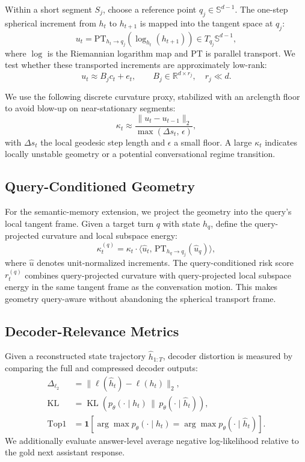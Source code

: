 \documentclass[conference]{IEEEtran}
\newcommand{\R}{\mathbb{R}}
\newcommand{\Sph}{\mathbb{S}}
\newcommand{\KL}{\operatorname{KL}}
\newcommand{\Logit}{\Delta_{\ell_2}}
\begin{document}
Within a short segment $S_j$, choose a reference point $q_j \in \Sph^{d-1}$. The one-step spherical increment from $h_t$ to $h_{t+1}$ is mapped into the tangent space at $q_j$:
\begin{equation}
u_t = \mathrm{PT}_{h_t \rightarrow q_j}\!\left(\log_{h_t}(h_{t+1})\right)
\in T_{q_j}\Sph^{d-1},
\end{equation}
where $\log$ is the Riemannian logarithm map and $\mathrm{PT}$ is parallel transport. We test whether these transported increments are approximately low-rank:
\begin{equation}
u_t \approx B_j c_t + e_t, \qquad B_j \in \R^{d \times r_j}, \quad r_j \ll d.
\end{equation}

We use the following discrete curvature proxy, stabilized with an arclength floor to avoid blow-up on near-stationary segments:
\begin{equation}
\kappa_t \approx \frac{\lVert u_t - u_{t-1} \rVert_2}{\max(\Delta s_t,\, \epsilon)},
\end{equation}
with $\Delta s_t$ the local geodesic step length and $\epsilon$ a small floor. A large $\kappa_t$ indicates locally unstable geometry or a potential conversational regime transition.

\subsection{Query-Conditioned Geometry}
For the semantic-memory extension, we project the geometry into the query's local tangent frame. Given a target turn $q$ with state $h_q$, define the query-projected curvature and local subspace energy:
\begin{equation}
\kappa_t^{(q)} = \kappa_t \cdot \langle \hat{u}_t,\, \mathrm{PT}_{h_q \rightarrow q_j}(\hat{u}_q) \rangle,
\end{equation}
where $\hat{u}$ denotes unit-normalized increments. The query-conditioned risk score $r_t^{(q)}$ combines query-projected curvature with query-projected local subspace energy in the same tangent frame as the conversation motion. This makes geometry query-aware without abandoning the spherical transport frame.

\subsection{Decoder-Relevance Metrics}
Given a reconstructed state trajectory $\widehat{h}_{1:T}$, decoder distortion is measured by comparing the full and compressed decoder outputs:
\begin{align}
\Logit &= \lVert \ell(\widehat{h}_t) - \ell(h_t) \rVert_2, \\
\KL &= \KL\!\left(p_\theta(\cdot \mid h_t)\, \| \, p_\theta(\cdot \mid \widehat{h}_t)\right), \\
\mathrm{Top1} &= \mathbf{1}\left[\arg\max p_\theta(\cdot \mid h_t) = \arg\max p_\theta(\cdot \mid \widehat{h}_t)\right].
\end{align}
We additionally evaluate answer-level average negative log-likelihood relative to the gold next assistant response.
\end{document}
